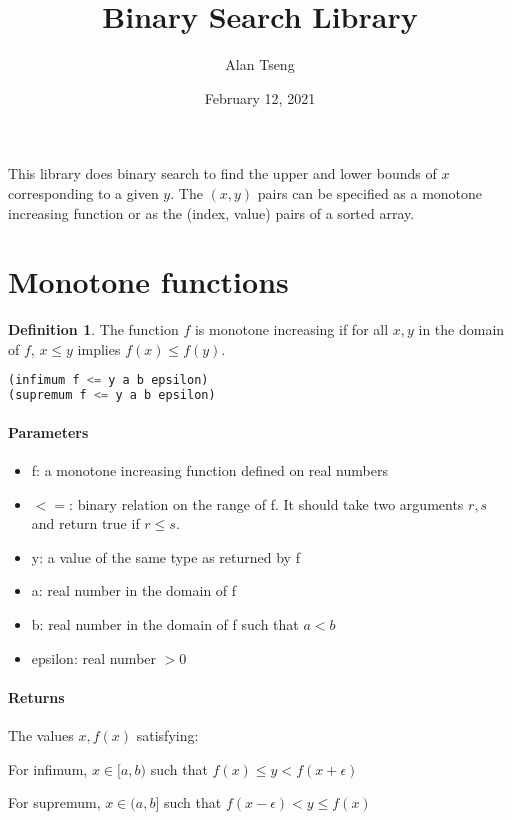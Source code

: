 \documentclass{article}
\title{Binary Search Library}
\author{Alan Tseng}
\date{February 12, 2021}
\theoremstyle{definition}
\newtheorem{defn}{Definition}
\begin{document}
\maketitle

This library does binary search to find the upper and lower bounds of $x$ corresponding to a given $y$.
The $(x, y)$ pairs can be specified as a monotone increasing function or as
the (index, value) pairs of a sorted array.

\section{Monotone functions}

\begin{defn}
	The function $f$ is monotone increasing if for all
	$x,y$ in the domain of $f$, $x \le y$ implies $f(x) \le f(y)$.
\end{defn}

\begin{lstlisting}[language=Lisp]
(infimum f <= y a b epsilon)
(supremum f <= y a b epsilon)
\end{lstlisting}

\paragraph{Parameters}
\begin{itemize}
\item f: a monotone increasing function defined on real numbers
\item $<=$: binary relation on the range of f. It should take
	two arguments $r, s$ and return true if $r \le s$.
\item y: a value of the same type as returned by f
\item a: real number in the domain of f
\item b: real number in the domain of f such that $a < b$
\item epsilon: real number $> 0$
\end{itemize}

\paragraph{Returns}
The values $x, f(x)$ satisfying:

For infimum, $x \in [a,b)$ such that $f(x) \le y < f(x+\epsilon)$

For supremum, $x \in (a,b]$ such that $f(x-\epsilon) < y \le f(x)$
\end{document}
